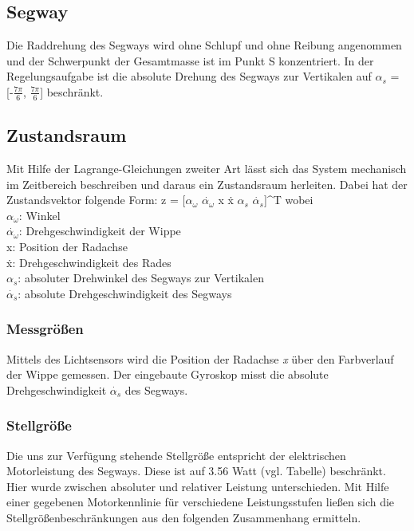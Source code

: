 \documentclass[pdf]{ifacconf}
\begin{document}
	\subsection{Segway}
	Die Raddrehung des Segways wird ohne Schlupf und ohne Reibung angenommen und der 		Schwerpunkt der Gesamtmasse ist im Punkt S konzentriert. 
	In der Regelungsaufgabe ist die absolute Drehung des Segways zur Vertikalen auf 		$\alpha^{}_{s}$ = [-$\frac{7\pi}{6}$, $\frac{7\pi}{6}$] beschränkt. %

	\subsection{Zustandsraum}
	Mit Hilfe der Lagrange-Gleichungen zweiter Art lässt sich das System mechanisch 		im Zeitbereich beschreiben und daraus ein Zustandsraum herleiten.
	Dabei hat der Zustandsvektor folgende Form:
	z = [$\alpha^{}_{\omega}$ $\dot{\alpha^{}_{\omega}}$ x \.{x} $\alpha^{}_{s}$ $\dot{\alpha^{}_{s}}$]^T
	wobei \\
	$\alpha^{}_{\omega}$: Winkel\\
	$\dot{\alpha^{}_{\omega}}$: Drehgeschwindigkeit der Wippe\\
	x:  Position der Radachse\\
	\.{x}:  Drehgeschwindigkeit des Rades\\
	$\alpha^{}_{s}$: absoluter Drehwinkel des Segways zur Vertikalen\\
	$\dot{\alpha^{}_{s}}$: absolute Drehgeschwindigkeit des Segways\\
	
		\subsubsection{Messgrößen}
		Mittels des Lichtsensors wird die Position der Radachse \textit{x} über den 		Farbverlauf der Wippe gemessen. Der eingebaute Gyroskop misst die absolute Drehgeschwindigkeit $\dot{\alpha^{}_{s}}$ des Segways.
		
		\subsubsection{Stellgröße}
		Die uns zur Verfügung stehende Stellgröße entspricht der elektrischen Motorleistung des Segways. Diese ist auf 3.56 Watt (vgl. Tabelle) beschränkt.
		Hier wurde zwischen absoluter und relativer Leistung unterschieden. Mit Hilfe einer gegebenen Motorkennlinie für verschiedene Leistungsstufen ließen sich die Stellgrößenbeschränkungen aus den folgenden Zusammenhang ermitteln.
\end{document}
